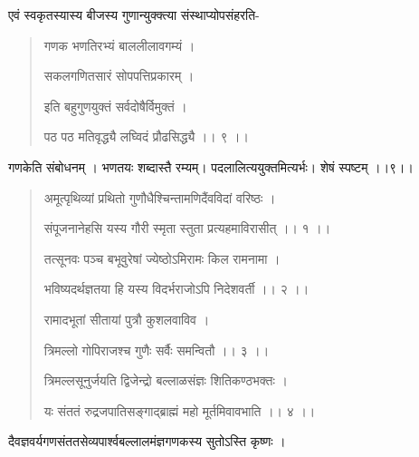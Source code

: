 \documentclass[11pt, openany]{book}
\begin{document}
\begin{sloppypar}
\hangindent=0.2in \hspace{0.2in}एवं स्वकृतस्यास्य बीजस्य गुणान्युक्क्त्या संस्थाप्योपसंहरति- 
 
\begin{quote}
\hangindent=0.2in \hspace{1in}गणक भणतिरभ्यं बाललीलावगम्यं । 

\hangindent=0.2in \hspace{1in}सकलगणितसारं सोपपत्तिप्रकारम् \textbar। 

\hangindent=0.2in \hspace{1in}इति बहुगुणयुक्तं सर्वदोषैर्विमुक्तं । 

\hangindent=0.2in \hspace{1in}पठ पठ मतिवृद्ध्यै लघ्विदं प्रौढसिद्ध्यै ।। ९ ।। 
\end{quote}

\hangindent=0.2in \hspace{0.2in}गणकेति संबोधनम् । भणतयः शब्दास्तै रम्यम्। पदलालित्ययुक्तमित्यर्भः। शेषं स्पष्टम् ।।९।।

\begin{quote}
\hangindent=0.2in \hspace{1in}अमूत्पृथिव्यां प्रथितो गुणौधैश्चिन्तामणिदैंवविदां वरिष्ठः । 

\hangindent=0.2in \hspace{1in}संपूजनानेहसि यस्य गौरी स्मृता स्तुता प्रत्यहमाविरासीत् ।। १ ।। 

\hangindent=0.2in \hspace{1in}तत्सूनवः पञ्च बभूवुरेषां ज्येष्ठोऽमिरामः किल रामनामा । 

\hangindent=0.2in \hspace{1in}भविष्यदर्थज्ञतया हि यस्य विदर्भराजोऽपि निदेशवर्ती ।। २ ।। 

\hangindent=0.2in \hspace{1in}रामादभूतां सीतायां पुत्रौ कुशलवाविव । 

\hangindent=0.2in \hspace{1in}त्रिमल्लो गोपिराजश्च गुणैः सर्वैः समन्वितौ ।। ३ ।। 

\hangindent=0.2in \hspace{1in}त्रिमल्लसूनुर्जयति द्विजेन्द्रो बल्लाळसंज्ञः शितिकण्ठभक्तः । 

\hangindent=0.2in \hspace{1in}यः संततं रुद्रजपातिसङ्गाद्ब्राह्मं महो मूर्तमिवावभाति ।। ४ ।। 
\end{quote}

\hangindent=0.2in \hspace{0.2in}दैवज्ञवर्यगणसंततसेव्यपार्श्वबल्लालमंज्ञगणकस्य सुतोऽस्ति कृष्णः । 


\end{sloppypar}
\end{document}
